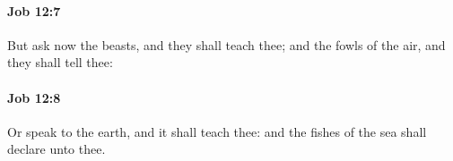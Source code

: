 		\paragraph{Job 12:7} %
			\label{JOB-12-7}

			But ask now the beasts, and they shall teach thee; and the fowls of the air, and they shall tell thee:


		\paragraph{Job 12:8} %
			\label{JOB-12-8}

			Or speak to the earth, and it shall teach thee: and the fishes of the sea shall declare unto thee.


